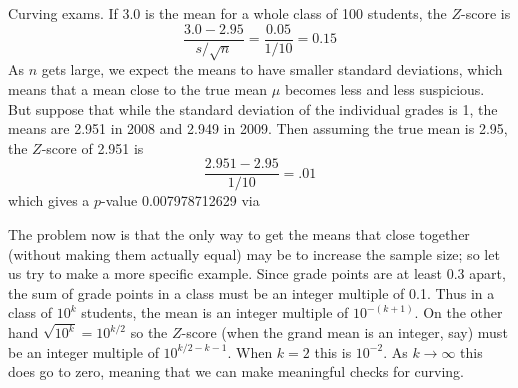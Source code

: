 \begin{example}{Curving exams.}
If 3.0 is the mean for a whole class of 100 students, the $Z$-score is
\[
	\frac{3.0-2.95}{s/\sqrt{n}} = \frac{0.05}{1/10} = 0.15
\]
As $n$ gets large, we expect the means to have smaller standard deviations, which means that a mean close to the true mean $\mu$ becomes less and less suspicious.
But suppose that while the standard deviation of the individual grades is 1, the means are 2.951 in 2008 and 2.949 in 2009.
Then assuming the true mean is 2.95, the $Z$-score of 2.951 is
\[
	\frac{2.951-2.95}{1/10} = .01
\]
which gives a $p$-value 0.007978712629 via


The problem now is that the only way to get the means that close together (without making them actually equal) may be to increase the sample size; so let us try to make a more specific example.
Since grade points are at least 0.3 apart, the sum of grade points in a class must be an integer multiple of 0.1. Thus in a class of $10^k$ students, the mean is an integer multiple of $10^{-(k+1)}$.
On the other hand $\sqrt{10^k}=10^{k/2}$ so the $Z$-score (when the grand mean is an integer, say) must be an integer multiple of $10^{k/2-k-1}$. When $k=2$ this is $10^{-2}$. As $k\to\infty$ this does go to zero, meaning that we can make meaningful checks for curving.
\end{example}


